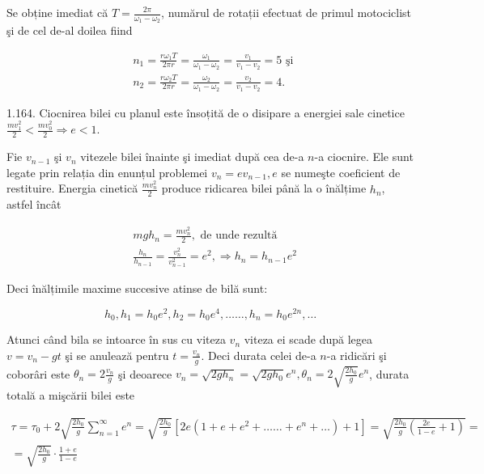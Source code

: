 Se obține imediat că $T=\frac{2 \pi}{\omega_{1}-\omega_{2}}$, numărul de rotații efectuat de primul motociclist şi de cel de-al doilea fiind

$$
\begin{aligned}
& n_{1}=\frac{r \omega_{1} T}{2 \pi r}=\frac{\omega_{1}}{\omega_{1}-\omega_{2}}=\frac{v_{1}}{v_{1}-v_{2}}=5 \text { şi } \\
& n_{2}=\frac{r \omega_{2} T}{2 \pi r}=\frac{\omega_{2}}{\omega_{1}-\omega_{2}}=\frac{v_{2}}{v_{1}-v_{2}}=4 .
\end{aligned}
$$

1.164. Ciocnirea bilei cu planul este însoțită de o disipare a energiei sale cinetice $\frac{m v_{1}^{2}}{2}<\frac{m v_{0}^{2}}{2} \Rightarrow e<1$.

Fie $v_{n-1}$ şi $v_{n}$ vitezele bilei înainte şi imediat după cea de-a $n$-a ciocnire. Ele sunt legate prin relația din enunțul problemei $v_{n}=e v_{n-1}, e$ se numeşte coeficient de restituire. Energia cinetică $\frac{m v_{n}^{2}}{2}$ produce ridicarea bilei până la o înălțime $h_{n}$, astfel încât

$$
\begin{aligned}
& m g h_{n}=\frac{m v_{n}^{2}}{2}, \text { de unde rezultă } \\
& \frac{h_{n}}{h_{n-1}}=\frac{v_{n}^{2}}{v_{n-1}^{2}}=e^{2}, \Rightarrow h_{n}=h_{n-1} e^{2}
\end{aligned}
$$

Deci înălțimile maxime succesive atinse de bilă sunt:

$$
h_{0}, h_{1}=h_{0} e^{2}, h_{2}=h_{0} e^{4}, \ldots \ldots, h_{n}=h_{0} e^{2 n}, \ldots
$$

Atunci când bila se intoarce în sus cu viteza $v_{n}$ viteza ei scade după legea $v=v_{n}-g t$ şi se anulează pentru $t=\frac{v_{n}}{g}$. Deci durata celei de-a $n$-a ridicări şi coborâri este $\theta_{n}=2 \frac{v_{n}}{g}$ şi deoarece $v_{n}=\sqrt{2 g h_{n}}=\sqrt{2 g h_{0}} e^{n}, \theta_{n}=2 \sqrt{\frac{2 h_{0}}{g}} e^{n}$, durata totală a mişcării bilei este

$$
\begin{gathered}
\tau=\tau_{0}+2 \sqrt{\frac{2 h_{0}}{g}} \sum_{n=1}^{\infty} e^{n}=\sqrt{\frac{2 h_{0}}{g}}\left[2 e\left(1+e+e^{2}+\ldots \ldots+e^{n}+\ldots\right)+1\right]=\sqrt{\frac{2 h_{0}}{g}\left(\frac{2 e}{1-e}+1\right)}= \\
=\sqrt{\frac{2 h_{0}}{g}} \cdot \frac{1+e}{1-e}
\end{gathered}
$$

